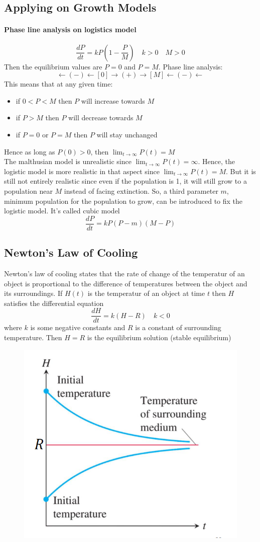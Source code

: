 \documentclass[12pt]{article}
\begin{document}
\subsection{Applying on Growth Models}
\paragraph{Phase line analysis on logistics model}
\[
    \frac{dP}{dt} = kP \left( 1 - \frac{P}{M} \right) \quad k > 0 \quad M > 0
\]
Then the equilibrium values are $P = 0$ and $P = M$. Phase line analysis:
\[
    \leftarrow( - )\leftarrow[0] \rightarrow( + )\rightarrow [M]\leftarrow ( -)\leftarrow 
\]
This means that at any given time:
\begin{itemize} 
    \item if $0 < P < M$ then $P$ will increase towards $M$
    \item if $P > M$ then $P$ will decrease towards $M$
    \item if $P = 0$ or $P = M$ then $P$ will stay unchanged     
\end{itemize}
Hence as long as $P(0) > 0$, then $\lim_{t \to \infty} P(t) = M$ \\

\noindent
The malthusian model is unrealistic since $\lim_{t \to \infty} P(t) = \infty$. Hence, the
logistic model is more realistic in that aspect since $\lim_{t \to \infty} P(t) = M$. But it is still
not entirely realistic since even if the population is 1, it will still grow to a population near $M$ instead of facing
extinction. So, a third parameter $m$, minimum population for the population to grow, can be introduced to fix the logistic model.
It's called cubic model
\[
    \frac{dP}{dt} = kP(P - m)(M - P) 
\]
\subsection{Newton's Law of Cooling}
Newton's law of cooling states that the rate of change of the temperatur of an object is proportional
to the difference of temperatures between the object and its surroundings. If $H(t)$ is the temperatur of an object
at time $t$ then $H$ satisfies the differential equation
\[
    \frac{dH}{dt} = k(H - R) \quad k < 0
\]
where $k$ is some negative constants and $R$ is a constant of surrounding temperature.
Then $H = R$ is the equilibrium solution (stable equilibrium)
\begin{figure}[H]
     \centering
     \includegraphics[width = 0.4\linewidth]{Images/newton's law of cooling.png}
\end{figure}
\end{document}
